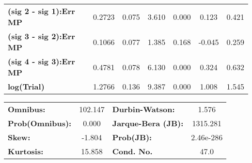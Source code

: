 \begin{center}
\begin{tabular}{lcccccc}
\textbf{(sig 2 - sig 1):Err MP} &       0.2723  &        0.075     &     3.610  &         0.000        &        0.123    &        0.421     \\
\textbf{(sig 3 - sig 2):Err MP} &       0.1066  &        0.077     &     1.385  &         0.168        &       -0.045    &        0.259     \\
\textbf{(sig 4 - sig 3):Err MP} &       0.4781  &        0.078     &     6.130  &         0.000        &        0.324    &        0.632     \\
\textbf{log(Trial)}             &       1.2766  &        0.136     &     9.387  &         0.000        &        1.008    &        1.545     \\
\bottomrule
\end{tabular}
\end{center}\begin{center}
\begin{tabular}{lclc}
\toprule
\textbf{Omnibus:}       & 102.147 & \textbf{  Durbin-Watson:     } &     1.576  \\
\textbf{Prob(Omnibus):} &   0.000 & \textbf{  Jarque-Bera (JB):  } &  1315.281  \\
\textbf{Skew:}          &  -1.804 & \textbf{  Prob(JB):          } & 2.46e-286  \\
\textbf{Kurtosis:}      &  15.858 & \textbf{  Cond. No.          } &      47.0  \\
\bottomrule
\end{tabular}
\end{center}



